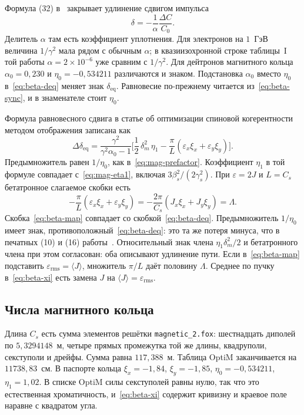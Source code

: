 Формула (32) в~\cite{Shoji2005} закрывает удлинение сдвигом импульса
\begin{equation}
\label{eq:beta-shoji32-main}
\delta=-\frac{1}{\alpha}\frac{\Delta C}{C_0}.
\end{equation} Делитель $\alpha$ там есть коэффициент уплотнения. Для электронов на $1$~ГэВ величина $1/\gamma^2$ мала рядом с обычным $\alpha$; в квазиизохронной строке таблицы~I той работы $\alpha=2\times 10^{-6}$ уже сравним с $1/\gamma^2$. Для дейтронов магнитного кольца $\alpha_0=0{,}230$ и $\eta_0=-0{,}534211$ различаются и знаком. Подстановка $\alpha_0$ вместо $\eta_0$ в~\eqref{eq:beta-deq} меняет знак $\delta_{\mathrm{eq}}$. Равновесие по-прежнему читается из~\eqref{eq:beta-sync}, и в знаменателе стоит $\eta_0$.

Формула равновесного сдвига в статье об оптимизации спиновой когерентности методом отображения записана как
\begin{equation}
\label{eq:beta-map}
\Delta\delta_{\mathrm{eq}}
=\frac{\gamma^2}{\gamma^2\alpha_0-1}
\Biggl[
\frac{1}{2}\,\delta_m^2\,\eta_1
-\frac{\pi}{L}(\varepsilon_x\xi_x+\varepsilon_y\xi_y)
\Biggr].
\end{equation}
Предымножитель равен $1/\eta_0$, как в~\eqref{eq:mag-prefactor}. Коэффициент $\eta_1$ в той формуле совпадает с~\eqref{eq:mag-eta1}, включая $3\beta_s^2/(2\gamma_s^2)$. При $\varepsilon=2J$ и $L=C_s$ бетатронное слагаемое скобки есть
\begin{equation}
\label{eq:beta-map-L}
-\frac{\pi}{L}(\varepsilon_x\xi_x+\varepsilon_y\xi_y)
=-\frac{2\pi}{C_s}(J_x\xi_x+J_y\xi_y)
=\Lambda.
\end{equation}
Скобка~\eqref{eq:beta-map} совпадает со скобкой~\eqref{eq:beta-deq}. Предымножитель $1/\eta_0$ имеет знак, противоположный~\eqref{eq:beta-deq}: это та же потеря минуса, что в печатных (10) и (16) работы~\cite{Senichev2013}. Относительный знак члена $\eta_1\delta_m^2/2$ и бетатронного члена при этом согласован: оба описывают удлинение пути. Если в~\eqref{eq:beta-map} подставить $\varepsilon_{\mathrm{rms}}=\langle J\rangle$, множитель $\pi/L$ даёт половину $\Lambda$. Среднее по пучку в~\eqref{eq:beta-xi} есть замена $J$ на $\langle J\rangle=\varepsilon_{\mathrm{rms}}$.

\subsection{Числа магнитного кольца}
\label{sec:ch2-num}

Длина $C_s$ есть сумма элементов решётки \texttt{magnetic\_2.fox}: шестнадцать диполей по $5{,}3294148$~м, четыре прямых промежутка той же длины, квадруполи, секступоли и дрейфы. Сумма равна $117{,}388$~м. Таблица OptiM заканчивается на $11738{,}83$~см. В паспорте кольца $\xi_x=-1{,}84$, $\xi_y=-1{,}85$, $\eta_0=-0{,}534211$, $\eta_1=1{,}02$. В списке OptiM силы секступолей равны нулю, так что это естественная хроматичность, и~\eqref{eq:beta-xi} содержит кривизну и краевое поле наравне с квадратом угла.

